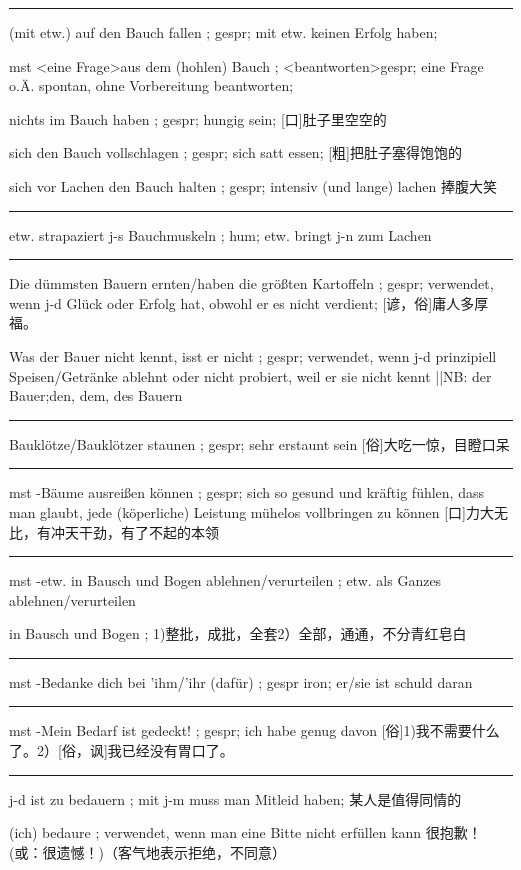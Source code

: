 \noindent\rule{\textwidth}{1pt} 
(mit etw.) auf den Bauch fallen ; gespr; mit etw. keinen Erfolg haben;

mst \textless eine Frage\textgreater  aus dem (hohlen) Bauch ; \textless beantworten\textgreater  gespr; eine Frage o.Ä. spontan, ohne Vorbereitung beantworten;

nichts im Bauch haben ; gespr; hungig sein;
[口]肚子里空空的

sich den Bauch vollschlagen ; gespr; sich satt essen;
[粗]把肚子塞得饱饱的

sich vor Lachen den Bauch halten ; gespr; intensiv (und lange) lachen
捧腹大笑

\noindent\rule{\textwidth}{1pt} 
etw. strapaziert j-s Bauchmuskeln ; hum; etw. bringt j-n zum Lachen

\noindent\rule{\textwidth}{1pt} 
Die dümmsten Bauern ernten/haben die größten Kartoffeln ; gespr; verwendet, wenn j-d Glück oder Erfolg hat, obwohl er es nicht verdient;
[谚，俗]庸人多厚福。

Was der Bauer nicht kennt, isst er nicht ; gespr; verwendet, wenn j-d prinzipiell Speisen/Getränke ablehnt oder nicht probiert, weil er sie nicht kennt ||NB: der Bauer;den, dem, des Bauern

\noindent\rule{\textwidth}{1pt} 
Bauklötze/Bauklötzer staunen ; gespr; sehr erstaunt sein
[俗]大吃一惊，目瞪口呆

\noindent\rule{\textwidth}{1pt} 
mst -Bäume ausreißen können ; gespr; sich so gesund und kräftig fühlen, dass man glaubt, jede (köperliche) Leistung mühelos vollbringen zu können
[口]力大无比，有冲天干劲，有了不起的本领

\noindent\rule{\textwidth}{1pt} 
mst -etw. in Bausch und Bogen ablehnen/verurteilen ; etw. als Ganzes ablehnen/verurteilen

in Bausch und Bogen ; 1)整批，成批，全套2）全部，通通，不分青红皂白

\noindent\rule{\textwidth}{1pt} 
mst -Bedanke dich bei 'ihm/'ihr (dafür) ; gespr iron; er/sie ist schuld daran

\noindent\rule{\textwidth}{1pt} 
mst -Mein Bedarf ist gedeckt! ; gespr; ich habe genug davon
[俗]1)我不需要什么了。2）[俗，讽]我已经没有胃口了。

\noindent\rule{\textwidth}{1pt} 
j-d ist zu bedauern ; mit j-m muss man Mitleid haben;
某人是值得同情的

(ich) bedaure ; verwendet, wenn man eine Bitte nicht erfüllen kann
很抱歉！(或：很遗憾！)（客气地表示拒绝，不同意）

